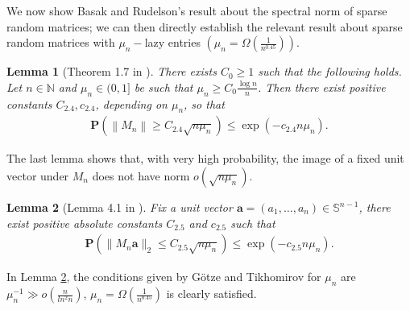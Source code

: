 \documentclass{article}
\numberwithin{equation}{section}
\theoremstyle{plain}
\newtheorem{lemma}{Lemma}[section]
\begin{document}
\par
We now show Basak and Rudelson's result \cite{MR3620692} about the spectral norm of sparse random matrices; we can then directly establish the relevant result about sparse random matrices with $\mu_n-$lazy entries $(\mu_{n}=\Omega(\frac{1}{n^{0.45}}))$.

\begin{lemma}[Theorem 1.7 in \cite{MR3620692}]\label{norm}
There exists $C_0 \geq 1$ such that the following holds. Let $n \in \mathbb{N}$ and $\mu_{n} \in(0,1]$ be such that $\mu_{n} \geq C_0 \frac{\log n}{n}$. Then there exist positive constants $C_{2.4}, c_{2.4}$, depending on $\mu_{n}$, so that
\begin{align*}
\textbf{P}\left(\left\|M_n\right\| \geq C_{2.4} \sqrt{n \mu_{n}}\right) \leq \exp \left(-c_{2.4} n \mu_{n}\right).
\end{align*}
\end{lemma}
The last lemma shows that, with very high probability, the image of a fixed unit vector under $M_n$ does not have norm $o(\sqrt{n\mu_{n}})$.
\par
\begin{lemma}[Lemma 4.1 in \cite{MR2663633}]\label{norm2}
Fix a unit vector $\boldsymbol{a}=\left(a_1, \ldots, a_n\right) \in \mathbb{S}^{n-1}$, there exist positive absolute constants $C_{2.5}$ and $c_{2.5}$ such that 
\begin{align*}
\textbf{P}\left(\|M_n\boldsymbol{a}\|_2 \leq C_{2.5} \sqrt{n \mu_{n}}\right) \leq \exp \left(-c_{2.5} n \mu_{n}\right).
\end{align*}
\end{lemma}
In Lemma \ref{norm2}, the conditions given by G\"{o}tze and Tikhomirov for $\mu_{n}$ are $\mu_{n}^{-1}\gg o(\frac {n} {ln^2n})$, $\mu_{n}=\Omega(\frac{1}{n^{0.45}})$ is clearly satisfied.
\end{document}

